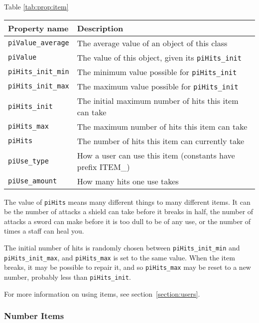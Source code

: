 \documentclass[12pt]{article}
\newcommand{\prop}[1]{\texttt{#1}}
\begin{document}
\begin{center}
\begin{center}Table \ref{tab:prop:item} \end{center}
\begin{tabular}{||l|l||} \hline
Property name & Description 
\\ \hline \hline
\prop{piValue\_average} &  The average value of an object of this class
\\ \hline
\prop{piValue}  &  The value of this object, given its \prop{piHits\_init}
\\ \hline
\prop{piHits\_init\_min} &  The minimum value possible for \prop{piHits\_init}
\\ \hline
\prop{piHits\_init\_max} &  The maximum value possible for \prop{piHits\_init}
\\ \hline
\prop{piHits\_init} &  The initial maximum number of hits this item can take
\\ \hline
\prop{piHits\_max}  &  The maximum number of hits this item can take 
\\ \hline
\prop{piHits}   &  The number of hits this item can currently take
\\ \hline
\prop{piUse\_type}   &  How a user can use this item (constants have
prefix ITEM\_)
\\ \hline
\prop{piUse\_amount} &  How many hits one use takes
\\ \hline
\end{tabular}
\label{tab:prop:item}
\end{center}

The value of \prop{piHits} means many different things to many
different items.  It can be the number of attacks a shield can take
before it breaks in half, the number of attacks a sword can make
before it is too dull to be of any use, or the number of times a staff
can heal you.

The initial number of hits is randomly chosen between
\prop{piHits\_init\_min} and \prop{piHits\_init\_max}, and
\prop{piHits\_max} is set to the same value.  When the item breaks, it
may be possible to repair it, and so \prop{piHits\_max} may be reset to
a new number, probably less than \prop{piHits\_init}.

For more information on using items, see section~\ref{section:users}.

\subsubsection{Number Items}
\end{document}
